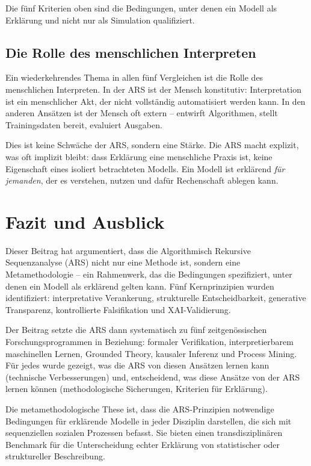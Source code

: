 \documentclass[12pt,a4paper]{article}
\begin{document}
Die fünf Kriterien oben sind die Bedingungen, unter denen ein Modell als 
Erklärung und nicht nur als Simulation qualifiziert.

\subsection{Die Rolle des menschlichen Interpreten}

Ein wiederkehrendes Thema in allen fünf Vergleichen ist die Rolle des 
menschlichen Interpreten. In der ARS ist der Mensch konstitutiv: Interpretation 
ist ein menschlicher Akt, der nicht vollständig automatisiert werden kann. In 
den anderen Ansätzen ist der Mensch oft extern – entwirft Algorithmen, stellt 
Trainingsdaten bereit, evaluiert Ausgaben.

Dies ist keine Schwäche der ARS, sondern eine Stärke. Die ARS macht explizit, 
was oft implizit bleibt: dass Erklärung eine menschliche Praxis ist, keine 
Eigenschaft eines isoliert betrachteten Modells. Ein Modell ist erklärend 
\textit{für jemanden}, der es verstehen, nutzen und dafür Rechenschaft 
ablegen kann.

\section{Fazit und Ausblick}

Dieser Beitrag hat argumentiert, dass die Algorithmisch Rekursive Sequenzanalyse 
(ARS) nicht nur eine Methode ist, sondern eine Metamethodologie – ein Rahmenwerk, 
das die Bedingungen spezifiziert, unter denen ein Modell als erklärend gelten 
kann. Fünf Kernprinzipien wurden identifiziert: interpretative Verankerung, 
strukturelle Entscheidbarkeit, generative Transparenz, kontrollierte Falsifikation 
und XAI-Validierung.

Der Beitrag setzte die ARS dann systematisch zu fünf zeitgenössischen 
Forschungsprogrammen in Beziehung: formaler Verifikation, interpretierbarem 
maschinellen Lernen, Grounded Theory, kausaler Inferenz und Process Mining. 
Für jedes wurde gezeigt, was die ARS von diesen Ansätzen lernen kann 
(technische Verbesserungen) und, entscheidend, was diese Ansätze von der 
ARS lernen können (methodologische Sicherungen, Kriterien für Erklärung).

Die metamethodologische These ist, dass die ARS-Prinzipien notwendige 
Bedingungen für erklärende Modelle in jeder Disziplin darstellen, die sich 
mit sequenziellen sozialen Prozessen befasst. Sie bieten einen transdisziplinären 
Benchmark für die Unterscheidung echter Erklärung von statistischer oder 
struktureller Beschreibung.
\end{document}
